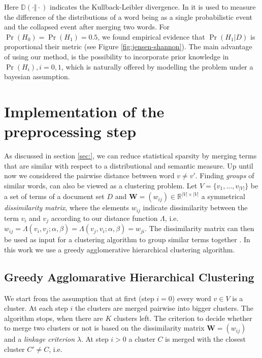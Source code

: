 Here $\mathbb{D}(\cdot \Vert \cdot)$ indicates the Kullback-Leibler divergence. In
\cite{baker1998distributional} it is used to measure the difference of the
distributions of a word being as a single probabilistic event and 
the collapsed event after merging two words. For $\Pr(H_0) = \Pr(H_1) = 0.5$,
we found empirical evidence that $\Pr(H_1|D)$ is proportional their metric (see Figure \ref{fig:jensen-shannon}).
The main advantage of using our method, is the possibility to incorporate prior 
knowledge in $\Pr(H_i), i=0,1$, which is naturally offered by modelling the
problem under a bayesian assumption.

\section{Implementation of the preprocessing step}

As discussed in section \ref{sec:}, we can reduce statistical sparsity
by merging terms that are similar with respect to a distributional and
semantic measure. Up until now we considered the pairwise distance
between word $v \neq v'$. Finding \emph{groups} of similar words, can also be
viewed as a clustering problem.
Let $V = \{v_1,\ldots,v_{|V|}\}$ be a set of terms of a document set $D$ and
$\mathbf{W}=(w_{ij}) \in \mathbb{R}^{|V|\times|V|}$ a symmetrical \emph{dissimilarity matrix}, 
where the elements $w_{ij}$ indicate dissimilarity between the term $v_i$ and
$v_j$ according to our distance function $\Lambda$, i.e.
$w_{ij} = \Lambda(v_i, v_j; \alpha, \beta) = \Lambda(v_j, v_i; \alpha, \beta) =
w_{ji}$. The dissimilarity matrix can then be used as input for a
clustering algorithm to group similar terms together
\cite{baker1998distributional}. In this work we use a greedy agglomerative
hierarchical clustering algorithm. 

\subsection{Greedy Agglomarative Hierarchical Clustering}

We start from the assumption that at first (step $i=0$) every word $v \in V$ is
a cluster. At each step $i$ the clusters are merged pairwise into bigger
clusters. The algorithm stops, when there are $K$ clusters left. The criterion
to decide whether to merge two clusters or not is based on the dissimilarity
matrix $\mathbf{W} = (w_{ij})$ and a \emph{linkage criterion} $\lambda$. At
step $i>0$ a cluster $C$ is merged with the closest cluster $C' \neq C$, i.e.

